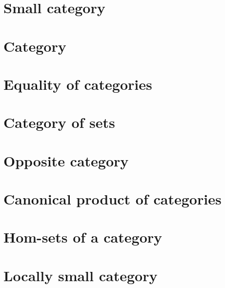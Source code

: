 \section{Small category}
    
\section{Category}
    
\section{Equality of categories}\label{section:cat:equal}
    
\section{Category of sets}
    
\section{Opposite category}
    
\section{Canonical product of categories}
    
\section{Hom-sets of a category}
    
\section{Locally small category}
    
